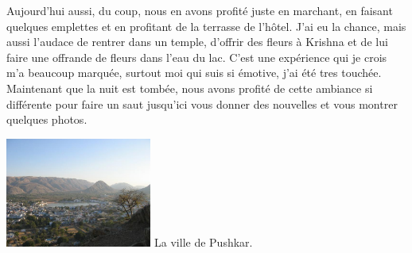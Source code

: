 \begin{multicols}{2}
Aujourd'hui aussi, du coup, nous en avons profité juste en marchant, en faisant quelques emplettes et en profitant de la terrasse de l'hôtel. J'ai eu la chance, mais aussi l'audace de rentrer dans un temple, d'offrir des fleurs à Krishna et de lui faire une offrande de fleurs dans l'eau du lac. C'est une expérience qui je crois m'a beaucoup marquée, surtout moi qui suis si émotive, j'ai été tres touchée.  Maintenant que la nuit est tombée, nous avons profité de cette ambiance si différente pour faire un saut jusqu'ici vous donner des nouvelles et vous montrer quelques photos.

\hspace*{-0.65cm}
\includegraphics[width=4.8cm]{articles/Journees-zen/pushkar.jpg}
La ville de Pushkar.

\end{multicols}


